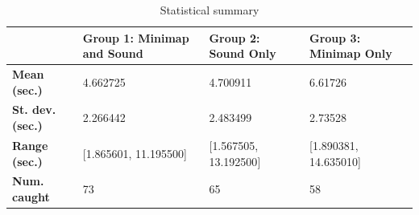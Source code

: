 	

\begin{table}[h]
	\label{tab:final_study_stats}
	\caption{Statistical summary}
	
	\begin{tabular}{|l|l|l|l|}
		\hline
		& \textbf{Group 1: Minimap and Sound} & \textbf{Group 2: Sound Only} & \textbf{Group 3: Minimap Only} \\ \hline
		\textbf{Mean (sec.)}  & 4.662725                            & 4.700911                     & 6.61726                        \\ \hline
		\textbf{St. dev. (sec.)}  & 2.266442                            & 2.483499                     & 2.73528                        \\ \hline
		\textbf{Range (sec.)} & {[}1.865601, 11.195500{]}           & {[}1.567505, 13.192500{]}    & {[}1.890381, 14.635010{]}      \\ \hline
		\textbf{Num. caught}  & 73                                  & 65                           & 58                             \\ \hline
	\end{tabular}
\end{table}